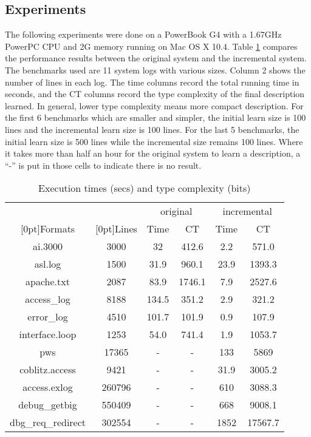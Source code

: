 \subsection{Experiments}
The following experiments were done on a PowerBook G4 with a 1.67GHz PowerPC
CPU and 2G memory running on Mac OS X 10.4. 
Table \ref{tab:results} compares the performance results between
the original \learnpads{} system and the incremental system. 
The benchmarks used are 11 system logs with various sizes. Column 2
shows the number of lines in each log. The time columns record the total
running time in seconds, and the CT columns record the type complexity
of the final description learned. In general, lower type complexity means
more compact description. For the first 6 benchmarks which are smaller
and simpler, the initial learn size is 100 lines and the 
incremental learn size is 100 lines. For the last 5 benchmarks, 
the initial learn size is 500 lines while the incremental size remains
100 lines. Where it takes more than half an hour for the original \learnpads{}
system to learn a description, a ``-'' is put in those cells to 
indicate there is no result.

\begin{table}[th]
\begin{tabular}{|c|c|c|c|c|c|}\hline
& & \multicolumn{2}{|c|}{original} & \multicolumn{2}{|c|}{incremental} \\ \cline{3-6}
\raisebox{1.5ex}[0pt]{Formats} & \raisebox{1.5ex}[0pt]{Lines} &
	Time & CT & Time & CT \\ \hline \hline
ai.3000	&	3000	& 32	& 412.6	& 2.2	& 571.0	\\ \hline
asl.log  &	1500	& 31.9	& 960.1	& 23.9 	& 1393.3 \\ \hline
apache.txt  &	2087	& 83.9 & 1746.1 & 7.9 	& 2527.6 \\ \hline
access\_log  &	8188 	& 134.5	& 351.2	& 2.9	& 321.2	\\ \hline
error\_log  &	4510	& 101.7	& 101.9	& 0.9	& 107.9 \\ \hline
interface.loop & 1253	& 54.0	& 741.4	& 1.9	& 1053.7 \\ \hline
pws	&	 17365	& -	& - 	& 133  & 5869 \\ \hline
coblitz.access & 9421   & -	& -	& 31.9 & 3005.2 \\ \hline
access.exlog & 260796 	& -	& -	& 610 & 3088.3 \\ \hline
debug\_getbig & 550409   & -	& -	& 668 & 9008.1 \\ \hline
dbg\_req\_redirect & 302554 & -	& -	& 1852 & 17567.7 \\ \hline
\end{tabular}
\caption{Execution times (secs) and type complexity (bits)} 
\label{tab:results}
\end{table}


